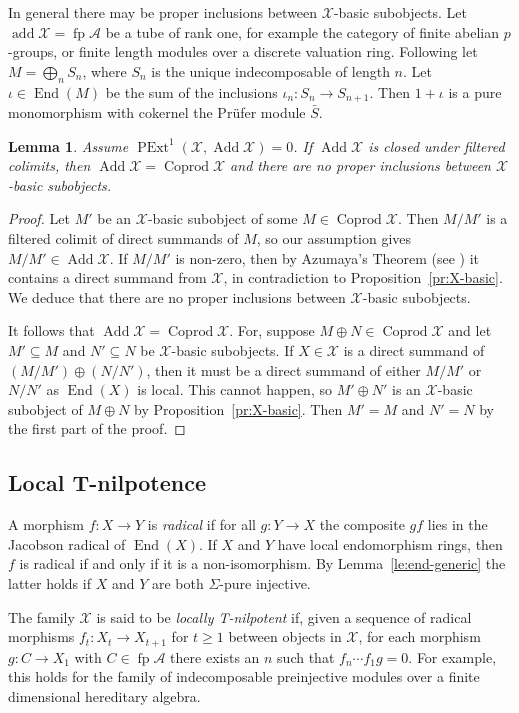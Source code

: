 \documentclass[a4paper]{amsart}
\theoremstyle{plain}
\newtheorem{lem}[thm]{Lemma}
\theoremstyle{definition}
\theoremstyle{remark}
\numberwithin{equation}{section}
\newcommand{\add}{\operatorname{add}}
\newcommand{\Add}{\operatorname{Add}}
\newcommand{\Coprod}{\operatorname{Coprod}}
\newcommand{\End}{\operatorname{End}}
\newcommand{\fp}{\operatorname{fp}}
\newcommand{\PExt}{\operatorname{PExt}}
\def\A{\mathcal A}
\def\X{\mathcal X}
\begin{document}
In general there may be proper inclusions between $\X$-basic subobjects. Let $\add\X=\fp\A$ be a tube of rank one, for example the category of finite abelian $p$-groups, or finite length modules over a discrete valuation ring. Following \cite[Example 1.G]{Ri1979} let $M=\bigoplus_nS_n$, where $S_n$ is the unique indecomposable of length $n$. Let $\iota\in\End(M)$ be the sum of the inclusions $\iota_n\colon S_n\to S_{n+1}$. Then $1+\iota$ is a pure monomorphism with cokernel the Pr\"ufer module $\bar S$.

\begin{lem}\label{le:no-pure-ext}
Assume $\PExt^1(\X,\Add\X)=0$. If $\Add\X$ is closed under filtered colimits, then $\Add\X=\Coprod\X$ and there are no proper inclusions between $\X$-basic subobjects.
\end{lem}

\begin{proof}
Let $M'$ be an $\X$-basic subobject of some $M\in\Coprod\X$. Then $M/M'$ is a filtered colimit of direct summands of $M$, so our assumption gives $M/M'\in\Add\X$. If $M/M'$ is non-zero, then by Azumaya's Theorem (see \cite[Theorem 12.6]{AF1992}) it contains a direct summand from $\X$, in contradiction to Proposition~\ref{pr:X-basic}. We deduce that there are no proper inclusions between $\X$-basic subobjects.

It follows that $\Add\X=\Coprod\X$. For, suppose $M\oplus N\in\Coprod\X$ and let $M'\subseteq M$ and $N'\subseteq N$ be $\X$-basic subobjects. If $X\in\X$ is a direct summand of $(M/M')\oplus(N/N')$, then it must be a direct summand of either $M/M'$ or $N/N'$ as $\End(X)$ is local. This cannot happen, so $M'\oplus N'$ is an $\X$-basic subobject of $M\oplus N$ by Proposition~\ref{pr:X-basic}. Then $M'=M$ and $N'=N$ by the first part of the proof.
\end{proof}



\subsection*{Local T-nilpotence}

A morphism $f\colon X\to Y$ is \emph{radical} if for all $g\colon Y\to X$ the composite $gf$ lies in the Jacobson radical of $\End(X)$. If $X$ and $Y$ have local endomorphism rings, then $f$ is radical if and only if it is a non-isomorphism. By Lemma~\ref{le:end-generic} the latter holds if $X$ and $Y$ are both $\Sigma$-pure injective.

The family $\X$ is said to be \emph{locally T-nilpotent} if, given a sequence of radical morphisms $f_t\colon X_t\to X_{t+1}$ for $t\geq1$ between objects in $\X$, for each morphism $g\colon C\to X_1$ with $C\in\fp\A$ there exists an $n$ such that $f_n\cdots f_1g=0$. For example, this holds for the family of indecomposable preinjective modules over a finite dimensional hereditary algebra.
\end{document}
